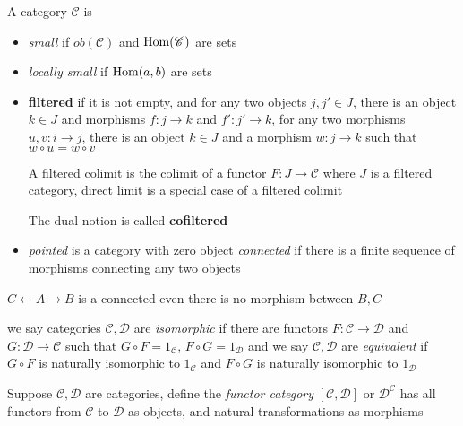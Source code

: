 \documentclass[main]{subfiles}
\begin{document}
\begin{definition}
A category $\mathscr C$ is 
\begin{itemize}
\item \textit{small} if $ob(\mathscr C)$ and $\operatorname{Hom}(\mathscr C)$ are sets
\item \textit{locally small} if $\operatorname{Hom}(a,b)$ are sets
\item \textbf{filtered} if it is not empty, and for any two objects $j,j'\in J$, there is an object $k\in J$ and morphisms $f:j\to k$ and $f':j'\to k$, for any two morphisms $u,v:i\to j$, there is an object $k\in J$ and a morphism $w:j\to k$ such that $w\circ u=w\circ v$ \par
A filtered colimit is the colimit of a functor $F:J\to\mathscr C$ where $J$ is a filtered category, direct limit is a special case of a filtered colimit \par
The dual notion is called \textbf{cofiltered}
\item \textit{pointed} is a category with zero object
\textit{connected} if there is a finite sequence of morphisms connecting any two objects
\end{itemize}
\end{definition}

\begin{example}
$C\leftarrow A\to B$ is a connected even there is no morphism between $B,C$
\end{example}

\begin{definition}
we say categories $\mathscr C,\mathscr D$ are \textit{isomorphic} if there are functors $F:\mathscr C\to\mathscr D$ and $G:\mathscr D\to\mathscr C$ such that $G\circ F=1_\mathscr{C}$, $F\circ G=1_\mathscr{D}$ and we say $\mathscr C,\mathscr D$ are \textit{equivalent} if $G\circ F$ is naturally isomorphic to $1_\mathscr{C}$ and $F\circ G$ is naturally isomorphic to $1_\mathscr{D}$
\end{definition}

\begin{definition}
Suppose $\mathscr C,\mathscr D$ are categories, define the \textit{functor category} $[\mathscr C,\mathscr D]$ or $\mathscr D^{\mathscr C}$ has all functors from $\mathscr C$ to $\mathscr D$ as objects, and natural transformations as morphisms
\end{definition}
\end{document}
